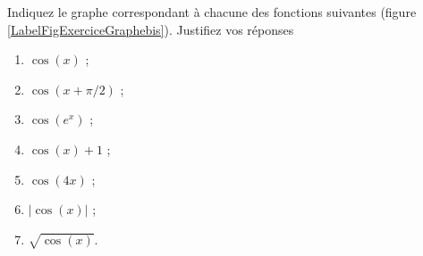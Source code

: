 
\begin{exercice}\label{exoDS2010bis-0002}

	Indiquez le graphe correspondant à chacune des fonctions suivantes (figure \ref{LabelFigExerciceGraphebis}). Justifiez vos réponses
\begin{multicols}{3}
  \begin{enumerate}
  \item $\cos (x) $ ;
  \item $\cos (x+\pi/2) $ ;
  \item $\cos(e^x) $ ;
  \item $ \cos(x)+1$ ;
  \item $\cos (4x) $ ; 
  \item $ |\cos(x)|$ ;
  \item $ \sqrt{\cos(x)}$.
  \end{enumerate}
\end{multicols}

\newcommand{\CaptionFigExerciceGraphesbis}{Les graphes à considérer de la question \ref{exoDS2010bis-0002}.} 


\end{exercice}
